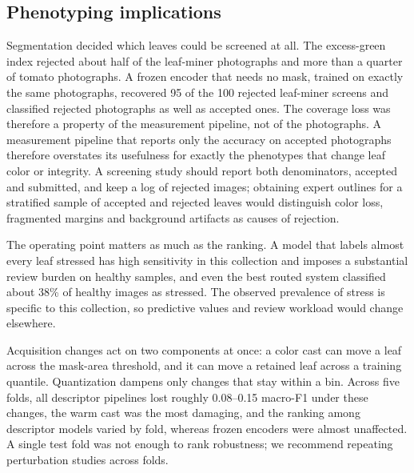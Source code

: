 \subsection{Phenotyping implications}
Segmentation decided which leaves could be screened at all. The excess-green index rejected about half of the leaf-miner photographs and more than a quarter of tomato photographs. A frozen encoder that needs no mask, trained on exactly the same photographs, recovered 95 of the 100 rejected leaf-miner screens and classified rejected photographs as well as accepted ones. The coverage loss was therefore a property of the measurement pipeline, not of the photographs. A measurement pipeline that reports only the accuracy on accepted photographs therefore overstates its usefulness for exactly the phenotypes that change leaf color or integrity. A screening study should report both denominators, accepted and submitted, and keep a log of rejected images; obtaining expert outlines for a stratified sample of accepted and rejected leaves would distinguish color loss, fragmented margins and background artifacts as causes of rejection.

The operating point matters as much as the ranking. A model that labels almost every leaf stressed has high sensitivity in this collection and imposes a substantial review burden on healthy samples, and even the best routed system classified about 38\% of healthy images as stressed. The observed prevalence of stress is specific to this collection, so predictive values and review workload would change elsewhere.

Acquisition changes act on two components at once: a color cast can move a leaf across the mask-area threshold, and it can move a retained leaf across a training quantile. Quantization dampens only changes that stay within a bin. Across five folds, all descriptor pipelines lost roughly 0.08--0.15 macro-F1 under these changes, the warm cast was the most damaging, and the ranking among descriptor models varied by fold, whereas frozen encoders were almost unaffected. A single test fold was not enough to rank robustness; we recommend repeating perturbation studies across folds.

